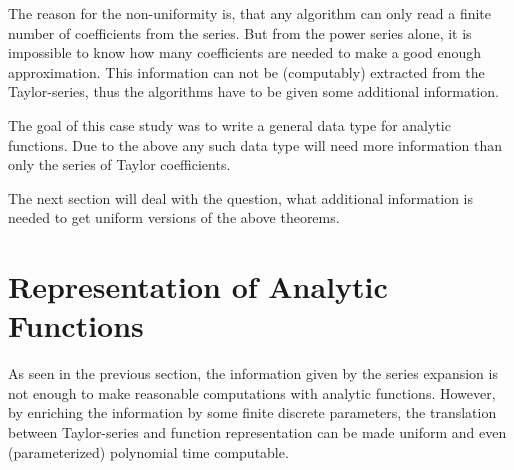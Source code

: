 		The reason for the non-uniformity is, that any algorithm can only read a finite number of 
		coefficients from the series.
    But from the power series alone, it is impossible to know how many coefficients are needed to make
		a good enough approximation.
    This information can not be (computably) extracted from the Taylor-series, thus the algorithms have to 
    be given some additional information.

		The goal of this case study was to write a general data type for analytic functions. 
		Due to the above any such data type will need more information than only the series of Taylor coefficients. 

		The next section will deal with the question, what additional information is needed to get uniform versions of the above theorems.

	\section{Representation of Analytic Functions}
	 As seen in the previous section, the information given by the series expansion is not enough to make reasonable computations with analytic functions.
	 However, by enriching the information by some finite discrete parameters, the translation between Taylor-series and function representation can be made uniform 
   and even (parameterized) polynomial time computable.
	 
